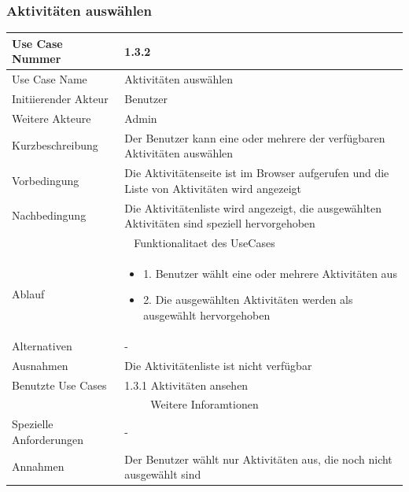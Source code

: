 \documentclass[10pt,a4paper]{article}
\begin{document}
	\subsubsection{Aktivit\"aten ausw\"ahlen}
	\begin{tabular}{|l|p{.5\linewidth}|}
	\hline Use Case Nummer & 1.3.2 \\ 
	\hline Use Case Name & Aktivit\"aten ausw\"ahlen \\ 
	\hline Initiierender Akteur & Benutzer \\
	\hline Weitere Akteure & Admin \\
	\hline Kurzbeschreibung & Der Benutzer kann eine oder mehrere der verf\"ugbaren Aktivit\"aten ausw\"ahlen \\
	\hline Vorbedingung & Die Aktivit\"atenseite ist im Browser aufgerufen und die Liste von Aktivit\"aten wird angezeigt \\
	\hline Nachbedingung & Die Aktivit\"atenliste wird angezeigt, die ausgew\"ahlten Aktivit\"aten sind speziell hervorgehoben \\
	\hline \multicolumn{2}{|c|}{Funktionalitaet des UseCases}\\
	\hline Ablauf & \begin{itemize}
			\item 1. Benutzer w\"ahlt eine oder mehrere Aktivit\"aten aus
			\item 2. Die ausgew\"ahlten Aktivit\"aten werden als ausgew\"ahlt hervorgehoben
		\end{itemize} \\
	\hline Alternativen & - \\
	\hline Ausnahmen & Die Aktivit\"atenliste ist nicht verf\"ugbar \\
	\hline Benutzte Use Cases & 1.3.1 Aktivit\"aten ansehen \\
	\hline \multicolumn{2}{|c|}{Weitere Inforamtionen} \\
	\hline Spezielle Anforderungen & - \\
	\hline Annahmen & Der Benutzer w\"ahlt nur Aktivit\"aten aus, die noch nicht ausgew\"ahlt sind \\
	\hline
	\end{tabular}
	
\end{document}
